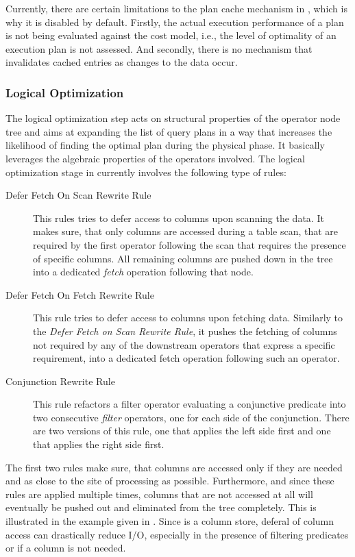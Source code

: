 Currently, there are certain limitations to the plan cache mechanism in \cottontail{}, which is why it is disabled by default. Firstly, the actual execution performance of a plan is not being evaluated against the cost model, i.e., the level of optimality of an execution plan is not assessed. And secondly, there is no mechanism that invalidates cached entries as changes to the data occur. 

\subsubsection{Logical Optimization}

The logical optimization step acts on structural properties of the operator node tree and aims at expanding the list of query plans in a way that increases the likelihood of finding the optimal plan during the physical phase. It basically leverages the algebraic properties of the operators involved. The logical optimization stage in \cottontail{}  currently involves the following type of rules:

\begin{description}
    \item[Defer Fetch On Scan Rewrite Rule] This rules tries to defer access to columns upon scanning the data. It makes sure, that only columns are accessed during a table scan, that are required by the first operator following the scan that requires the presence of specific columns. All remaining columns are pushed down in the tree into a dedicated \emph{fetch} operation following that node.
 
    \item[Defer Fetch On Fetch Rewrite Rule] This rule tries to defer access to columns upon fetching data. Similarly to the \emph{Defer Fetch on Scan Rewrite Rule}, it pushes the fetching of columns not required by any of the downstream operators that express a specific requirement, into a dedicated fetch operation following such an operator.
    
    \item[Conjunction Rewrite Rule] This rule refactors a filter operator evaluating a conjunctive predicate into two consecutive \emph{filter} operators, one for each side of the conjunction. There are two versions of this rule, one that applies the left side first and one that applies the right side first.
\end{description}

The first two rules make sure, that columns are accessed only if they are needed and as close to the site of processing as possible. Furthermore, and since these rules are applied multiple times, columns that are not accessed at all will eventually be pushed out and eliminated from the tree completely. This is illustrated in the example given in . Since \cottontail{} is a column store, deferal of column access can drastically reduce I/O, especially in the presence of filtering predicates or if a column is not needed. 

